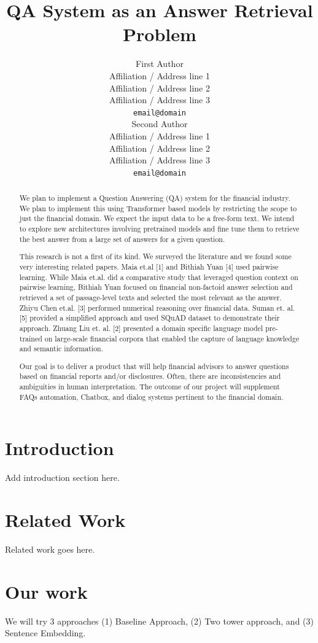 \documentclass[11pt,a4paper]{article}
\title{QA System as an Answer Retrieval Problem}
\author{First Author \\
  Affiliation / Address line 1 \\
  Affiliation / Address line 2 \\
  Affiliation / Address line 3 \\
  \texttt{email@domain} \\\And
  Second Author \\
  Affiliation / Address line 1 \\
  Affiliation / Address line 2 \\
  Affiliation / Address line 3 \\
  \texttt{email@domain} \\}
\date{}
\begin{document}
\maketitle
\begin{abstract}
We plan to implement a Question Answering (QA) system for the financial industry. We plan to implement this using Transformer based models by restricting the scope to just the financial domain. We expect the input data to be a free-form text. We intend to explore new architectures involving pretrained models and fine tune them to retrieve the best answer from a large set of answers for a given question.

This research is not a first of its kind. We surveyed the literature and we found some very interesting related papers. Maia et.al [1] and Bithiah Yuan [4] used pairwise learning. While Maia et.al. did a comparative study that leveraged question context on pairwise learning, Bithiah Yuan focused on financial non-factoid answer selection and retrieved a  set of passage-level texts and selected the most relevant as the answer. Zhiyu Chen et.al. [3] performed numerical reasoning over financial data. Suman et. al. [5] provided a simplified approach and used SQuAD dataset to demonstrate their approach. Zhuang Liu et. al. [2] presented a domain specific language model pre-trained on large-scale financial corpora that enabled the capture of language knowledge and semantic information.

Our goal is to deliver a product that will help financial advisors to answer questions based on financial reports and/or disclosures. Often, there are inconsistencies and ambiguities in human interpretation. The outcome of our project will supplement FAQs automation, Chatbox, and dialog systems pertinent to the financial domain. 

\end{abstract}

\section{Introduction}

Add introduction section here.


\section{Related Work}
\label{sec:length}

Related work goes here.


\section{Our work}
We will try 3 approaches (1) Baseline Approach, (2) Two tower approach, and (3) Sentence Embedding.
\end{document}
